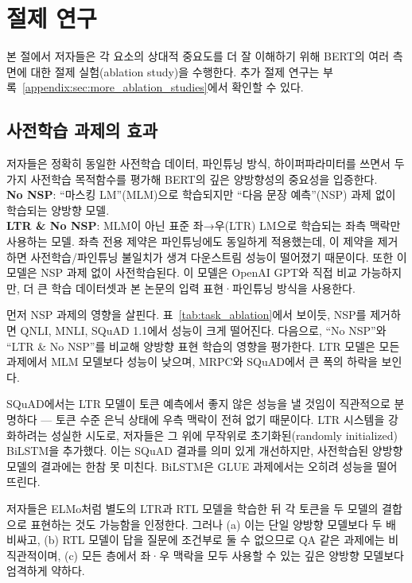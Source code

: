 \section{절제 연구}
\label{sec:ablation}
본 절에서 저자들은 각 요소의 상대적 중요도를 더 잘 이해하기 위해 BERT의 여러 측면에 대한 절제 실험(ablation study)을 수행한다. 추가 절제 연구는 부록~\ref{appendix:sec:more_ablation_studies}에서 확인할 수 있다.

\subsection{사전학습 과제의 효과}

\label{sec:task_ablation}
저자들은  정확히 동일한 사전학습 데이터, 파인튜닝 방식, 하이퍼파라미터를 쓰면서 두 가지 사전학습 목적함수를 평가해 BERT의 깊은 양방향성의 중요성을 입증한다.
\vspace{0.3cm}
\\
\noindent\textbf{No NSP}: ``마스킹 LM''(MLM)으로 학습되지만 ``다음 문장 예측''(NSP) 과제 없이 학습되는 양방향 모델.\\
\noindent\textbf{LTR \& No NSP}: MLM이 아닌 표준 좌→우(LTR) LM으로 학습되는 좌측 맥락만 사용하는 모델. 좌측 전용 제약은 파인튜닝에도 동일하게 적용했는데, 이 제약을 제거하면 사전학습/파인튜닝 불일치가 생겨 다운스트림 성능이 떨어졌기 때문이다. 또한 이 모델은 NSP 과제 없이 사전학습된다. 이 모델은 OpenAI GPT와 직접 비교 가능하지만, 더 큰 학습 데이터셋과 본 논문의 입력 표현·파인튜닝 방식을 사용한다.


먼저 NSP 과제의 영향을 살핀다. 표~\ref{tab:task_ablation}에서 보이듯, NSP를 제거하면 QNLI, MNLI, SQuAD 1.1에서 성능이 크게 떨어진다. 다음으로, ``No NSP''와 ``LTR \& No NSP''를 비교해 양방향 표현 학습의 영향을 평가한다. LTR 모델은 모든 과제에서 MLM 모델보다 성능이 낮으며, MRPC와 SQuAD에서 큰 폭의 하락을 보인다.

SQuAD에서는 LTR 모델이 토큰 예측에서 좋지 않은 성능을 낼 것임이 직관적으로 분명하다 — 토큰 수준 은닉 상태에 우측 맥락이 전혀 없기 때문이다.
LTR 시스템을 강화하려는 성실한 시도로, 저자들은 그 위에 무작위로 초기화된(randomly initialized) BiLSTM을 추가했다. 이는 SQuAD 결과를 의미 있게 개선하지만, 사전학습된 양방향 모델의 결과에는 한참 못 미친다. BiLSTM은 GLUE 과제에서는 오히려 성능을 떨어뜨린다.

저자들은 ELMo처럼 별도의 LTR과 RTL 모델을 학습한 뒤 각 토큰을 두 모델의 결합으로 표현하는 것도 가능함을 인정한다. 그러나 (a) 이는 단일 양방향 모델보다 두 배 비싸고, (b) RTL 모델이 답을 질문에 조건부로 둘 수 없으므로 QA 같은 과제에는 비직관적이며, (c) 모든 층에서 좌·우 맥락을 모두 사용할 수 있는 깊은 양방향 모델보다 엄격하게 약하다.


